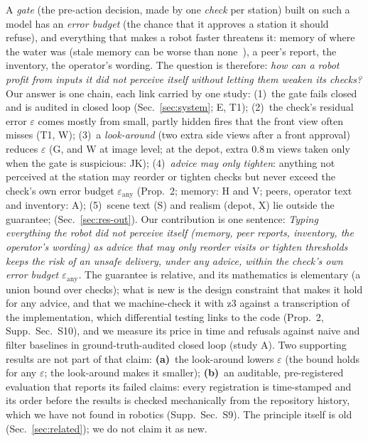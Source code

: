 \documentclass[conference]{IEEEtran}
\newcommand{\contribsent}{Typing everything the robot did not perceive itself (memory, peer reports, inventory, the operator's wording) as advice that may only reorder visits or tighten thresholds keeps the risk of an unsafe delivery, under any advice, within the check's own error budget $\varepsilon_{\mathrm{any}}$.}
\begin{document}
A \emph{gate} (the pre-action decision, made by one \emph{check} per station) built on such a model has an \emph{error budget} (the chance that it approves a station it should refuse), and everything that makes a robot faster threatens it: memory of where
the water was (stale memory can be worse than none~\cite{sun2026memorylies}), a peer's report, the inventory, the operator's wording.
The question is therefore: \emph{how can a robot profit from inputs it did not perceive itself without letting them weaken its checks?}
Our answer is one chain, each link carried by one study:
(1)~the gate fails closed and is audited in closed loop (Sec.~\ref{sec:system}; E, T1);
(2)~the check's residual error $\varepsilon$ comes mostly from small, partly hidden fires that the front view often misses (T1, W);
(3)~a \emph{look-around} (two extra side views after a front approval) reduces $\varepsilon$ (G, and W at image level; at the depot, extra 0.8\,m views taken only when the gate is suspicious: JK);
(4)~\emph{advice may only tighten}: anything not perceived at the station may reorder or tighten checks but never exceed the check's own error budget $\varepsilon_{\mathrm{any}}$ (Prop.~2; memory: H and V; peers, operator text and inventory: A);
(5)~scene text (S) and realism (depot, X) lie outside the guarantee;  (Sec.~\ref{sec:res-out}).
Our contribution is one sentence: \emph{\contribsent}
The guarantee is relative, and its mathematics is elementary (a union bound over checks); what is new is the design constraint that makes it hold for any advice, and that we machine-check it with z3 against a transcription of the implementation, which differential testing links to the code (Prop.~2, Supp.~Sec.~S10), and we measure its price in time and refusals against naive and filter baselines in ground-truth-audited closed loop (study A).
Two supporting results are not part of that claim:
\textbf{(a)}~the look-around lowers $\varepsilon$ (the bound holds for any $\varepsilon$; the look-around makes it smaller);
\textbf{(b)}~an auditable, pre-registered evaluation that reports its failed claims: every registration is time-stamped and its order before the results is checked mechanically from the repository history, which we have not found in robotics (Supp.~Sec.~S9).
The principle itself is old (Sec.~\ref{sec:related}); we do not claim it as new.
\end{document}
